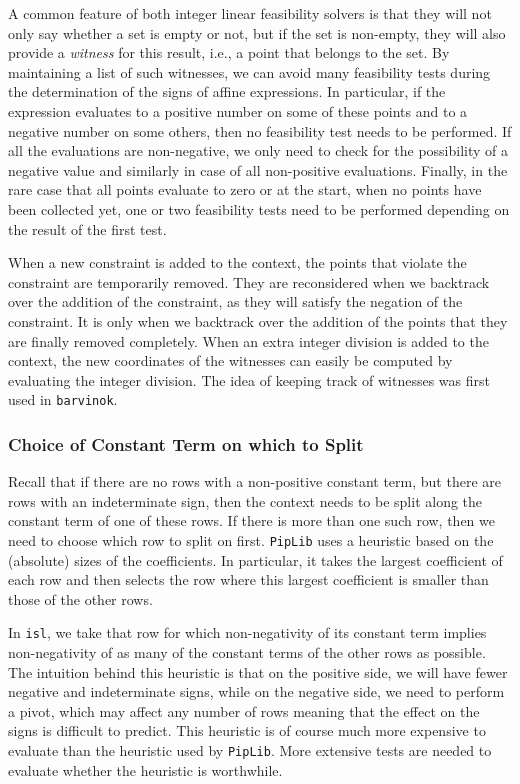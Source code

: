 A common feature of both integer linear feasibility solvers is that
they will not only say whether a set is empty or not, but if the set
is non-empty, they will also provide a \emph{witness} for this result,
i.e., a point that belongs to the set.  By maintaining a list of such
witnesses, we can avoid many feasibility tests during the determination
of the signs of affine expressions.  In particular, if the expression
evaluates to a positive number on some of these points and to a negative
number on some others, then no feasibility test needs to be performed.
If all the evaluations are non-negative, we only need to check for the
possibility of a negative value and similarly in case of all
non-positive evaluations.  Finally, in the rare case that all points
evaluate to zero or at the start, when no points have been collected yet,
one or two feasibility tests need to be performed depending on the result
of the first test.

When a new constraint is added to the context, the points that
violate the constraint are temporarily removed.  They are reconsidered
when we backtrack over the addition of the constraint, as they will
satisfy the negation of the constraint.  It is only when we backtrack
over the addition of the points that they are finally removed completely.
When an extra integer division is added to the context,
the new coordinates of the
witnesses can easily be computed by evaluating the integer division.
The idea of keeping track of witnesses was first used in {\tt barvinok}.

\subsubsection{Choice of Constant Term on which to Split}

Recall that if there are no rows with a non-positive constant term,
but there are rows with an indeterminate sign, then the context
needs to be split along the constant term of one of these rows.
If there is more than one such row, then we need to choose which row
to split on first.  {\tt PipLib} uses a heuristic based on the (absolute)
sizes of the coefficients.  In particular, it takes the largest coefficient
of each row and then selects the row where this largest coefficient is smaller
than those of the other rows.

In {\tt isl}, we take that row for which non-negativity of its constant
term implies non-negativity of as many of the constant terms of the other
rows as possible.  The intuition behind this heuristic is that on the
positive side, we will have fewer negative and indeterminate signs,
while on the negative side, we need to perform a pivot, which may
affect any number of rows meaning that the effect on the signs
is difficult to predict.  This heuristic is of course much more
expensive to evaluate than the heuristic used by {\tt PipLib}.
More extensive tests are needed to evaluate whether the heuristic is worthwhile.

